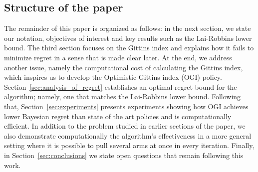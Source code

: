  


\subsection{Structure of the paper}
The remainder of this paper is organized as follows: in the next section, we state our notation, objectives of interest 
and key results such as the Lai-Robbins lower bound. The third section focuses on the Gittins index and explains how it fails to minimize regret in a sense that is made clear later. At the end, we address another issue, namely the computational cost of calculating the Gittins index, which inspires us to develop the Optimistic Gittins index (OGI) policy. Section~\ref{sec:analysis_of_regret} establishes an optimal regret bound for the algorithm; namely, one that matches the Lai-Robbins lower bound. Following that, Section~\ref{sec:experiments} presents experiments showing how OGI achieves lower Bayesian regret than state of the art policies and is computationally efficient. In addition to the problem studied in earlier sections of the paper, we also demonstrate computationally the algorithm's effectiveness in a more general setting where it is possible to pull several arms at once in every iteration. Finally, in Section~\ref{sec:conclusions} we state open questions that remain following this work.